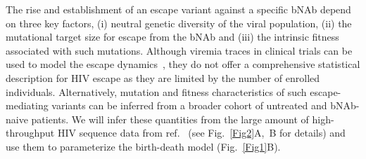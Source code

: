 \documentclass[aps,prx,noshowpacs,twocolumn,nofootinbib]{revtex4-2}
\begin{document}
The rise and establishment of an escape variant against a specific bNAb depend on three key factors, (i) {neutral} genetic diversity of the viral population, (ii) the mutational target size for escape from the bNAb and (iii) the intrinsic fitness associated with such mutations. Although viremia traces in clinical trials can be used to model the escape dynamics~\cite{Lu:2016id,Reeves:2020ca,Saha:2020fd,meijersPredictingVivoEscape2021}, they do not offer a comprehensive statistical description for HIV escape as they are limited by the number of  enrolled individuals. Alternatively, mutation and fitness characteristics of such escape-mediating variants can be inferred from a broader cohort of untreated and bNAb-naive patients. We  will infer these quantities from the large amount of high-throughput HIV sequence data from ref.~\cite{Zanini:2015gg} (see Fig.~\ref{Fig2}A,~B for details) and use them to parameterize the birth-death model (Fig.~\ref{Fig1}B).
\end{document}
